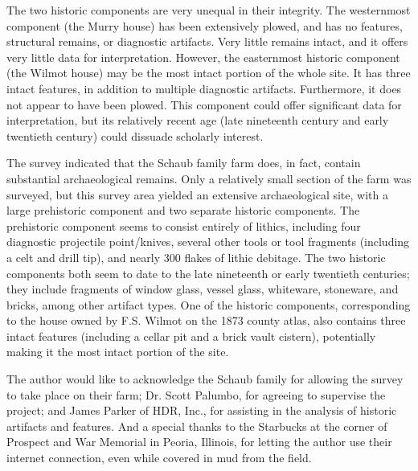 The two historic components are very unequal in their integrity. The westernmost component (the Murry house) has been extensively plowed, and has no features, structural remains, or diagnostic artifacts. Very little remains intact, and it offers very little data for interpretation. However, the easternmost historic component (the Wilmot house) may be the most intact portion of the whole site. It has three intact features, in addition to multiple diagnostic artifacts. Furthermore, it does not appear to have been plowed. This component could offer significant data for interpretation, but its relatively recent age (late nineteenth century and early twentieth century) could dissuade scholarly interest.


\nopagebreak[4]
The survey indicated that the Schaub family farm does, in fact, contain substantial archaeological remains. Only a relatively small section of the farm was surveyed, but this survey area yielded an extensive archaeological site, with a large prehistoric component and two separate historic components. The prehistoric component seems to consist entirely of lithics, including four diagnostic projectile point/knives, several other tools or tool fragments (including a celt and drill tip), and nearly 300 flakes of lithic debitage. The two historic components both seem to date to the late nineteenth or early twentieth centuries; they include fragments of window glass, vessel glass, whiteware, stoneware, and bricks, among other artifact types. One of the historic components, corresponding to the house owned by F.S. Wilmot on the 1873 county atlas, also contains three intact features (including a cellar pit and a brick vault cistern), potentially making it the most intact portion of the site.

\IJSRAseparator


The author would like to acknowledge the Schaub family for allowing the survey to take place on their farm; Dr. Scott Palumbo, for agreeing to supervise the project; and James Parker of HDR, Inc., for assisting in the analysis of historic artifacts and features. And a special thanks to the Starbucks at the corner of Prospect and War Memorial in Peoria, Illinois, for letting the author use their internet connection, even while covered in mud from the field.


\IJSRAseparator

